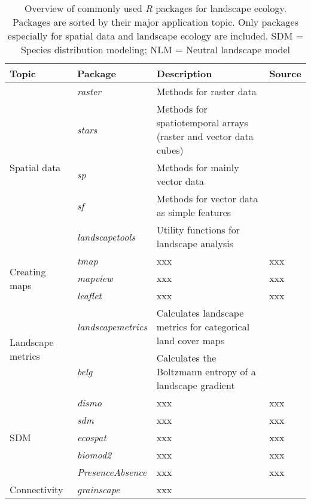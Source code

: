 \documentclass[smallextended]{svjour3}       %
\begin{document}
\begin{landscape}

\begin{center}
  \begin{table}
    \begin{tabularx}{0.9\linewidth}{XXXX}
      \caption{Overview of commonly used \textit{R} packages for landscape ecology. Packages are sorted by their major application topic. Only packages especially for spatial data and landscape ecology are included. SDM = Species distribution modeling; NLM = Neutral landscape model} \\
      \hline
      Topic & Package & Description & Source \\
      \hline
      \multirow{5}{*}{Spatial data} & \textit{raster} & Methods for raster data & \cite{Hijmans2019} \\
      & \textit{stars} & Methods for spatiotemporal arrays (raster and vector data cubes) & \cite{Pebesma2019} \\
      & \textit{sp} & Methods for mainly vector data & \cite{Pebesma2005,Bivand2013} \\
      & \textit{sf} & Methods for vector data as simple features & \cite{Pebesma2018} \\
      & \textit{landscapetools} & Utility functions for landscape analysis & \cite{Sciaini2018} \\
      \hline
      \multirow{3}{*}{Creating maps} & \textit{tmap} & xxx & xxx \\
      & \textit{mapview} & xxx & xxx \\
      & \textit{leaflet} & xxx & xxx \\
      \hline
      \multirow{2}{*}{Landscape metrics} & \textit{landscapemetrics} & Calculates landscape metrics for categorical land cover maps & \cite{Hesselbarth2019a} \\
      & \textit{belg} & Calculates the Boltzmann entropy of a landscape gradient & \cite{Nowosad2019a} \\
      \hline
      \multirow{5}{*}{SDM} & \textit{dismo} & xxx & xxx \\
      & \textit{sdm} & xxx & xxx \\
      & \textit{ecospat} & xxx & xxx \\
      & \textit{biomod2} & xxx & xxx \\
      & \textit{PresenceAbsence} & xxx & xxx \\
      \hline
      \multirow{3}{*}{Connectivity} & \textit{grainscape} & xxx & \cite{Chubaty2020} \\

\end{tabularx}
\end{table}
\end{center}
\end{landscape}
\end{document}
